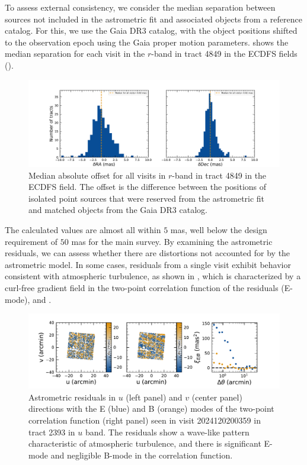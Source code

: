 To assess external consistency, we consider the median separation between sources not included in the astrometric fit and associated objects from a reference catalog.
For this, we use the Gaia \gls{DR3} catalog, with the object positions shifted to the observation epoch using the Gaia proper motion parameters.
 shows the median separation for each visit in the $r$-band in \gls{tract} 4849 in the ECDFS fields ().
\begin{figure}[htb]
\includegraphics[width=\linewidth]{Astrometry_AA1}
\caption{Median absolute offset for all visits in $r$-band in \gls{tract} 4849 in the ECDFS field. 
The offset is the difference between the positions of isolated point sources that were reserved from the astrometric fit and matched objects from the Gaia DR3 catalog.}
\label{fig:AA1}
\end{figure}
The calculated values are almost all within $5$\xspace mas, well below the design requirement of $50$\xspace mas for the main survey.
By examining the astrometric residuals, we can assess whether there are distortions not accounted for by the astrometric model. 
In some cases, residuals from a single visit exhibit behavior consistent with atmospheric turbulence, as shown in , which is characterized by a curl-free gradient field in the two-point correlation function of the residuals (E-mode),  \citet{2021A&A...650A..81L} and \citet{2021AJ....162..106F}. 
\begin{figure}[htb]
\includegraphics[width=\linewidth]{Astrometry_2024120200359}
\caption{Astrometric residuals in $u$ (left panel) and $v$ (center panel) directions with the E (blue) and B (orange) modes of the two-point correlation function (right panel) 
seen in visit 2024120200359 in tract 2393 in $u$ band.
The residuals show a wave-like pattern characteristic of atmospheric turbulence, and there is significant E-mode and negligible B-mode in the correlation function.}
\label{fig:Astrometry_Emode}
\end{figure}
